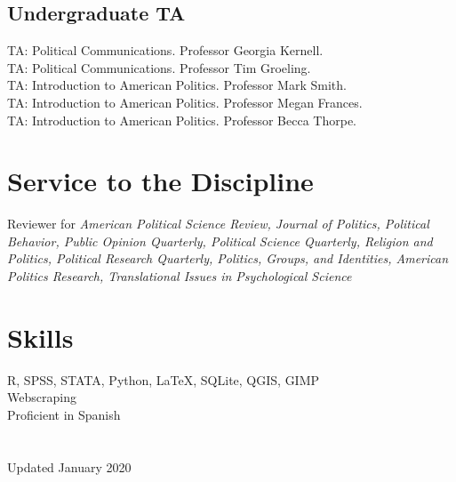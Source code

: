\documentclass[11pt, a4paper]{article}
\newcommand{\years}[1]{\marginnote{\scriptsize #1}}
\begin{document}
\subsection*{Undergraduate TA}

\years{2018} TA: Political Communications. Professor Georgia Kernell.\\
\years{} TA: Political Communications. Professor Tim Groeling.\\
\years{2015} TA: Introduction to American Politics. Professor Mark Smith.\\
\years{} TA: Introduction to American Politics. Professor Megan Frances.\\
\years{2014} TA: Introduction to American Politics. Professor Becca Thorpe.

\section*{Service to the Discipline}

Reviewer for \textit{American Political Science Review, Journal of Politics, Political Behavior, Public Opinion Quarterly, Political Science Quarterly, Religion and Politics, Political Research Quarterly, Politics, Groups, and Identities, American Politics Research, Translational Issues in Psychological Science}

\section*{Skills}

R, SPSS, STATA, Python, \LaTeX, SQLite, QGIS, GIMP\\
Webscraping\\
Proficient in Spanish\\
\\
\\
Updated January 2020
\end{document}

